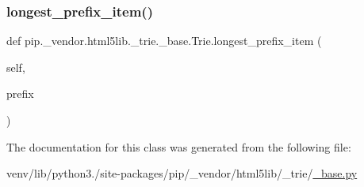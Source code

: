 \subsubsection{\texorpdfstring{longest\+\_\+prefix\+\_\+item()}{longest\_prefix\_item()}}
{\footnotesize\ttfamily def pip.\+\_\+vendor.\+html5lib.\+\_\+trie.\+\_\+base.\+Trie.\+longest\+\_\+prefix\+\_\+item (\begin{DoxyParamCaption}\item[{}]{self,  }\item[{}]{prefix }\end{DoxyParamCaption})}



The documentation for this class was generated from the following file\+:\begin{DoxyCompactItemize}
\item 
venv/lib/python3./site-\/packages/pip/\+\_\+vendor/html5lib/\+\_\+trie/\hyperlink{pip_2__vendor_2html5lib_2__trie_2__base_8py}{\+\_\+base.\+py}\end{DoxyCompactItemize}
